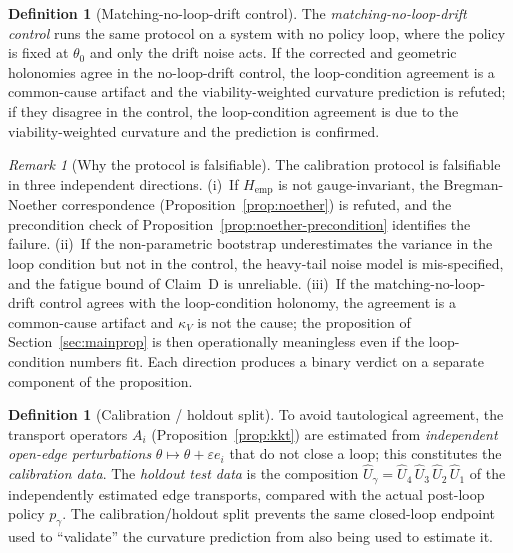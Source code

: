 \documentclass[11pt,a4paper]{article}
\theoremstyle{plain}
\theoremstyle{definition}
\newtheorem{definition}[theorem]{Definition}
\theoremstyle{remark}
\newtheorem{remark}[theorem]{Remark}
\newcommand{\kk}{\kappa_{\!V}}
\begin{document}
\begin{definition}[Matching-no-loop-drift control]
\label{def:control}
The \emph{matching-no-loop-drift control} runs the same protocol on a
system with no policy loop, where the policy is fixed at $\theta_0$
and only the drift noise acts. If the corrected and geometric
holonomies agree in the no-loop-drift control, the loop-condition
agreement is a common-cause artifact and the viability-weighted
curvature prediction is refuted; if they disagree in the control, the
loop-condition agreement is due to the viability-weighted curvature
and the prediction is confirmed.
\end{definition}

\begin{remark}[Why the protocol is falsifiable]
The calibration protocol is falsifiable in three independent
directions. (i)~If $H_{\mathrm{emp}}$ is not gauge-invariant, the
Bregman-Noether correspondence (Proposition~\ref{prop:noether}) is
refuted, and the precondition check of
Proposition~\ref{prop:noether-precondition} identifies the failure.
(ii)~If the non-parametric bootstrap underestimates the variance in
the loop condition but not in the control, the heavy-tail noise model
is mis-specified, and the fatigue bound of Claim~D is unreliable.
(iii)~If the matching-no-loop-drift control agrees with the
loop-condition holonomy, the agreement is a common-cause artifact and
$\kk$ is not the cause; the proposition of
Section~\ref{sec:mainprop} is then operationally meaningless even if
the loop-condition numbers fit. Each direction produces a binary
verdict on a separate component of the proposition.
\end{remark}

\begin{definition}[Calibration / holdout split]
\label{def:calholdout}
To avoid tautological agreement, the transport operators $A_i$
(Proposition~\ref{prop:kkt}) are estimated from \emph{independent
open-edge perturbations} $\theta \mapsto \theta + \varepsilon e_i$
that do not close a loop; this constitutes the \emph{calibration data}.
The \emph{holdout test data} is the composition
$\widehat{U}_\gamma = \widehat{U}_4\,\widehat{U}_3\,\widehat{U}_2\,
\widehat{U}_1$ of the independently estimated edge transports,
compared with the actual post-loop policy $p_\gamma$. The
calibration/holdout split prevents the same closed-loop endpoint used
to ``validate'' the curvature prediction from also being used to
estimate it.
\end{definition}
\end{document}
